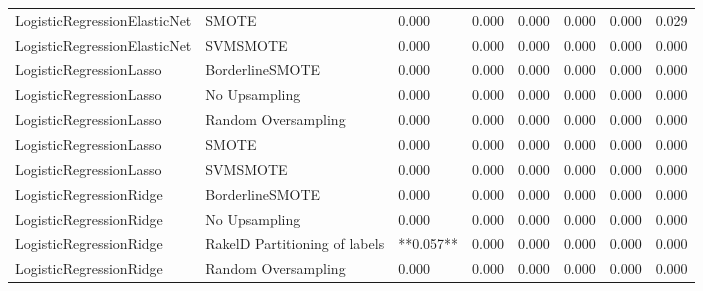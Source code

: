 \begin{tabular}{llllllll}
   LogisticRegressionElasticNet &                         SMOTE &     0.000 &                     0.000 &                 0.000 &                  0.000 &                                   0.000 &     0.029 \\
   LogisticRegressionElasticNet &                      SVMSMOTE &     0.000 &                     0.000 &                 0.000 &                  0.000 &                                   0.000 &     0.000 \\
        LogisticRegressionLasso &               BorderlineSMOTE &     0.000 &                     0.000 &                 0.000 &                  0.000 &                                   0.000 &     0.000 \\
        LogisticRegressionLasso &                 No Upsampling &     0.000 &                     0.000 &                 0.000 &                  0.000 &                                   0.000 &     0.000 \\
        LogisticRegressionLasso &           Random Oversampling &     0.000 &                     0.000 &                 0.000 &                  0.000 &                                   0.000 &     0.000 \\
        LogisticRegressionLasso &                         SMOTE &     0.000 &                     0.000 &                 0.000 &                  0.000 &                                   0.000 &     0.000 \\
        LogisticRegressionLasso &                      SVMSMOTE &     0.000 &                     0.000 &                 0.000 &                  0.000 &                                   0.000 &     0.000 \\
        LogisticRegressionRidge &               BorderlineSMOTE &     0.000 &                     0.000 &                 0.000 &                  0.000 &                                   0.000 &     0.000 \\
        LogisticRegressionRidge &                 No Upsampling &     0.000 &                     0.000 &                 0.000 &                  0.000 &                                   0.000 &     0.000 \\
        LogisticRegressionRidge & RakelD Partitioning of labels & **0.057** &                     0.000 &                 0.000 &                  0.000 &                                   0.000 &     0.000 \\
        LogisticRegressionRidge &           Random Oversampling &     0.000 &                     0.000 &                 0.000 &                  0.000 &                                   0.000 &     0.000 \\

\end{tabular}
